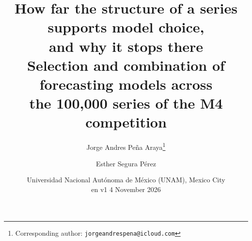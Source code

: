 %
%

\title{How far the structure of a series supports model choice,\\
       and why it stops there\\
       \large Selection and combination of forecasting models across\\
       the 100{,}000 series of the M4 competition}

\author{Jorge Andres Pe\~na Araya\thanks{Corresponding author:
        \texttt{jorgeandrespena@icloud.com}} \and Esther Segura P\'erez}
\newcommand{\versionborrador}{en v1 \textperiodcentered{} 4 November 2026}

\date{Universidad Nacional Aut\'onoma de M\'exico (UNAM), Mexico City\\[2pt]
      {\small\ttfamily\versionborrador}}

\setlength{\floatsep}{8pt plus 2pt minus 2pt}
\setlength{\textfloatsep}{10pt plus 2pt minus 2pt}
\setlength{\intextsep}{8pt plus 2pt minus 2pt}
\renewcommand{\topfraction}{0.9}
\renewcommand{\bottomfraction}{0.8}
\renewcommand{\textfraction}{0.07}
\renewcommand{\floatpagefraction}{0.8}
\setcounter{topnumber}{3}
\setcounter{bottomnumber}{2}
\setcounter{totalnumber}{4}


